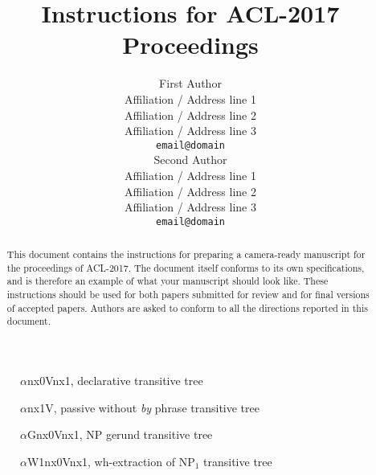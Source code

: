 \documentclass[11pt,a4paper]{article}
\title{Instructions for ACL-2017 Proceedings}
\author{First Author \\
  Affiliation / Address line 1 \\
  Affiliation / Address line 2 \\
  Affiliation / Address line 3 \\
  {\tt email@domain} \\\And
  Second Author \\
  Affiliation / Address line 1 \\
  Affiliation / Address line 2 \\
  Affiliation / Address line 3 \\
  {\tt email@domain} \\}
\date{}
\begin{document}
\maketitle
\begin{abstract}
  This document contains the instructions for preparing a camera-ready
  manuscript for the proceedings of ACL-2017. The document itself
  conforms to its own specifications, and is therefore an example of
  what your manuscript should look like. These instructions should be
  used for both papers submitted for review and for final versions of
  accepted papers.  Authors are asked to conform to all the directions
  reported in this document.
\end{abstract}


\begin{figure}
\centering
{}
\caption{$\alpha$nx0Vnx1, declarative transitive tree}
\label{fig:declarative}
\end{figure}

\begin{figure}
\centering
{}
\caption{$\alpha$nx1V, passive without {\em by} phrase transitive tree }
\label{fig:passive}
\end{figure}

\begin{figure}
\centering
{}
\caption{$\alpha$Gnx0Vnx1, NP gerund transitive tree}
\label{fig:gerund}
\end{figure}

\begin{figure}
\centering
{}
\caption{$\alpha$W1nx0Vnx1, wh-extraction of NP$_1$ transitive tree}
\label{fig:whmovement}
\end{figure}
\end{document}
